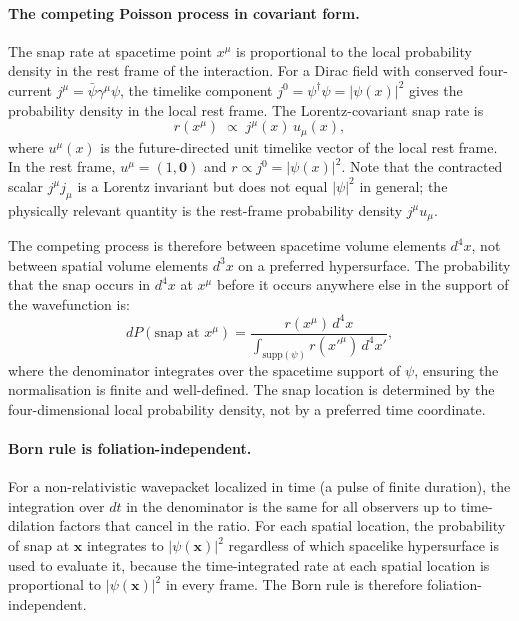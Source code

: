 \documentclass[11pt,a4paper]{article}
\theoremstyle{plain}
\theoremstyle{definition}
\theoremstyle{remark}
\begin{document}
\paragraph{The competing Poisson process in covariant form.}
The snap rate at spacetime point $x^\mu$ is proportional to the local probability
density in the rest frame of the interaction. For a Dirac field with conserved
four-current $j^\mu = \bar{\psi}\gamma^\mu\psi$, the timelike component
$j^0 = \psi^\dagger\psi = |\psi(x)|^2$ gives the probability density in the local
rest frame. The Lorentz-covariant snap rate is
\begin{equation}
  r(x^\mu) \;\propto\; j^\mu(x)\,u_\mu(x),
\end{equation}
where $u^\mu(x)$ is the future-directed unit timelike vector of the local rest
frame. In the rest frame, $u^\mu = (1,\mathbf{0})$ and $r \propto j^0 = |\psi(x)|^2$.
Note that the contracted scalar $j^\mu j_\mu$ is a Lorentz invariant but does not
equal $|\psi|^2$ in general; the physically relevant quantity is the rest-frame
probability density $j^\mu u_\mu$.

The competing process is therefore between spacetime volume elements $d^4x$, not
between spatial volume elements $d^3x$ on a preferred hypersurface. The
probability that the snap occurs in $d^4x$ at $x^\mu$ before it occurs anywhere
else in the support of the wavefunction is:
\begin{equation}
  dP(\text{snap at } x^\mu) = \frac{r(x^\mu)\,d^4x}{\int_{\mathrm{supp}(\psi)} r(x'^\mu)\,d^4x'},
\end{equation}
where the denominator integrates over the spacetime support of $\psi$, ensuring
the normalisation is finite and well-defined. The snap location is determined by
the four-dimensional local probability density, not by a preferred time coordinate.

\paragraph{Born rule is foliation-independent.}
For a non-relativistic wavepacket localized in time (a pulse of finite duration),
the integration over $dt$ in the denominator is the same for all observers up to
time-dilation factors that cancel in the ratio. For each spatial location, the
probability of snap at $\mathbf{x}$ integrates to $|\psi(\mathbf{x})|^2$
regardless of which spacelike hypersurface is used to evaluate it, because the
time-integrated rate at each spatial location is proportional to $|\psi(\mathbf{x})|^2$
in every frame. The Born rule is therefore foliation-independent.
\end{document}
